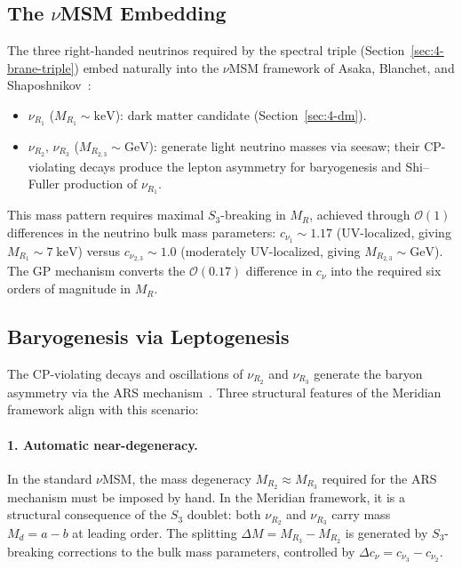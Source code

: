 \subsection{The $\nu$MSM Embedding}
\label{sec:4-numsm}

The three right-handed neutrinos required by the spectral triple (Section~\ref{sec:4-brane-triple}) embed naturally into the $\nu$MSM framework of Asaka, Blanchet, and Shaposhnikov~\cite{ch4:ABS2005}:
\begin{itemize}
  \item $\nu_{R_1}$ ($M_{R_1} \sim \mathrm{keV}$): dark matter candidate (Section~\ref{sec:4-dm}).
  \item $\nu_{R_2},\, \nu_{R_3}$ ($M_{R_{2,3}} \sim \mathrm{GeV}$): generate light neutrino masses via seesaw; their CP-violating decays produce the lepton asymmetry for baryogenesis and Shi--Fuller production of $\nu_{R_1}$.
\end{itemize}
This mass pattern requires maximal $S_3$-breaking in $M_R$, achieved through $\mathcal{O}(1)$ differences in the neutrino bulk mass parameters: $c_{\nu_1} \sim 1.17$ (UV-localized, giving $M_{R_1} \sim 7\;\mathrm{keV}$) versus $c_{\nu_{2,3}} \sim 1.0$ (moderately UV-localized, giving $M_{R_{2,3}} \sim \mathrm{GeV}$). The GP mechanism converts the $\mathcal{O}(0.17)$ difference in $c_\nu$ into the required six orders of magnitude in $M_R$.

\subsection{Baryogenesis via Leptogenesis}
\label{sec:4-baryogenesis}

The CP-violating decays and oscillations of $\nu_{R_2}$ and $\nu_{R_3}$ generate the baryon asymmetry via the ARS mechanism~\cite{ch4:ARS1998,ch4:AsakaShaposhnikov2005}. Three structural features of the Meridian framework align with this scenario:

\paragraph{1. Automatic near-degeneracy.} In the standard $\nu$MSM, the mass degeneracy $M_{R_2} \approx M_{R_3}$ required for the ARS mechanism must be imposed by hand. In the Meridian framework, it is a structural consequence of the $S_3$ doublet: both $\nu_{R_2}$ and $\nu_{R_3}$ carry mass $M_d = a - b$ at leading order. The splitting $\Delta M = M_{R_3} - M_{R_2}$ is generated by $S_3$-breaking corrections to the bulk mass parameters, controlled by $\Delta c_\nu = c_{\nu_3} - c_{\nu_2}$.


